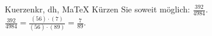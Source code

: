 \begin{MAufgabe}{Kuerzen}{kr, dh, MaTeX}
K\"urzen Sie soweit m\"oglich: $\frac{392}{4984}$.\\ 
\ifLsg\MLoesung
\quad $\frac{392}{4984}=\frac{(56)\cdot(7)}{(56)\cdot(89)}=\frac{7}{89}$.\else\relax\fi
 \end{MAufgabe}